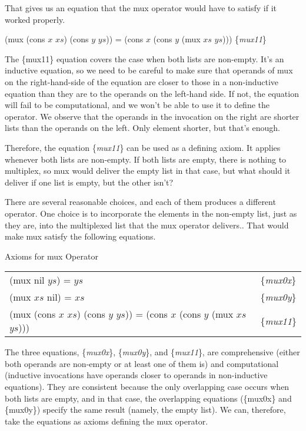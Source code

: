 That gives us an equation that the mux operator
would have to satisfy if it worked properly.

\hspace{1cm} (mux (cons $x$ $xs$) (cons $y$ $ys$)) = (cons $x$ (cons $y$ (mux $xs$ $ys$)))
\hfill \{\emph{mux11}\}

The \{mux11\} equation covers the case when both lists are non-empty.
It's an inductive equation, so we need to be careful to make sure
that operands of mux on the right-hand-side of the equation
are closer to those in a non-inductive equation than they are
to the operands on the left-hand side.
If not, the equation will fail to be computational, and
we won't be able to use it to define the operator.
We observe that the operands in the invocation on the
right are shorter lists than the operands on the left.
Only  element shorter, but that's enough.

Therefore, the equation \{\emph{mux11}\} can be used
as a defining axiom. It applies whenever both lists are non-empty.
If both lists are empty, there is nothing to multiplex,
so mux would deliver the empty list in that case, but
what should it deliver if one list is empty, but the other isn't?

There are several reasonable choices, and each of them produces
a different operator. One choice is to incorporate the elements
in the non-empty list, just as they are, into the
multiplexed list that the mux operator delivers..
That would make mux satisfy the following equations.

\begin{center}
Axioms for mux Operator
\begin{tabular}{ll}
(mux nil $ys$) = $ys$  & \{\emph{mux0x}\}     \\
(mux $xs$ nil) = $xs$  & \{\emph{mux0y}\}     \\
(mux (cons $x$ $xs$) (cons $y$ $ys$)) = (cons $x$ (cons $y$ (mux $xs$ $ys$))) & \{\emph{mux11}\} \\
\end{tabular}
\end{center}

\label{def:mux}
The three equations, \{\emph{mux0x}\}, \{\emph{mux0y}\}, and \{\emph{mux11}\},
are comprehensive (either both operands are non-empty
or at least one of them is) and computational
(inductive invocations have operands closer to operands in non-inductive equations).
They are consistent because the only overlapping case
occurs when both lists are empty, and in that case,
the overlapping equations
(\{mux0x\} and \{mux0y\}) specify the same result
(namely, the empty list).
We can, therefore, take the equations as axioms
defining the mux operator.

